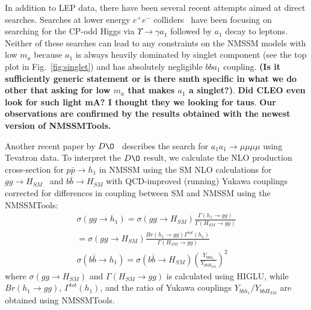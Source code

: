 \documentclass[aps,prl,twocolumn,nofootinbib,superscriptaddress]{revtex4}
\begin{document}
{In addition to LEP data, there have been several recent attempts aimed at direct searches. 
Searches at lower energy $e^+e^-$ colliders~\cite{cleo-low-ma,babar-low-ma} have been focusing on searching for the CP-odd Higgs 
via $\Upsilon \to \gamma a_1$ followed by $a_1$ decay to leptons. Neither of these searches can 
lead to any constraints on the NMSSM models with low $m_a$ because $a_1$ is always heavily dominated 
by singlet component (see the top plot in Fig.~\ref{fig:singlet}) and has absolutely negligible 
$bba_1$ coupling. {\bf (Is it sufficiently generic statement or is there smth specific in what we 
do other that asking for low $m_a$ that makes $a_1$ a singlet?)}. {\bf Did CLEO even look for such 
light mA? I thought they we looking for taus}. {\bf Our observations are confirmed by the results
obtained with the newest version of NMSSMTools.}

Another recent paper by $D\O$~\cite{d0-low-ma} describes the search for $a_1 a_1 \to \mu \mu \mu \mu$
using Tevatron data. To interpret the $D\O$ result, we calculate the NLO production cross-section for
$p \bar{p} \to h_1$ in NMSSM using the SM NLO calculations for $gg \to H_{SM}$~\cite{Spira:1995rr} and $b\bar{b} \to H_{SM}$
with QCD-improved (running) Yukawa couplings~\cite{Balazs:1998sb} corrected for differences in coupling between SM 
and NMSSM using the NMSSMTools:
\begin{eqnarray}
\sigma(gg\to h_1)=\sigma(gg\to H_{SM})\frac{\Gamma(h_1\to gg)}{\Gamma(H_{SM}\to gg)} \\ \nonumber
=\sigma(gg\to H_{SM})\frac{Br(h_1\to gg)\Gamma^{tot}(h_1)}{\Gamma(H_{SM}\to gg)} \\
\label{eq:ggcross_section} 
\sigma(b\bar{b}\to h_1)=\sigma(b\bar{b}\to H_{SM})
\left(\frac{Y_{bbh_1}}{Y_{bbH_{SM}}}\right)^2
\label{eq:bbcross_section} 
\end{eqnarray}
where $\sigma(gg\to H_{SM})$ and $\Gamma(H_{SM}\to gg)$ is calculated using
HIGLU, while $Br(h_1\to gg)$, $\Gamma^{tot}(h_1)$, and the ratio of Yukawa couplings 
$Y_{bbh_1}/Y_{bbH_{SM}}$ are obtained using NMSSMTools.

}
\end{document}
